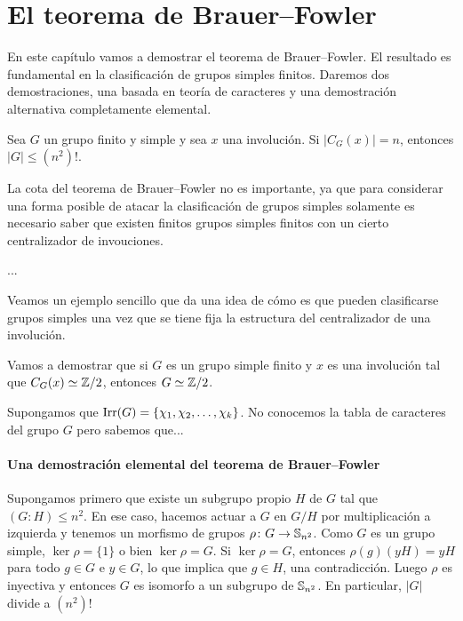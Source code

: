 \chapter{El teorema de Brauer--Fowler}

En este capítulo vamos a demostrar el teorema de Brauer--Fowler. El resultado es fundamental
en la clasificación de grupos simples finitos. Daremos dos demostraciones, una basada en 
teoría de caracteres y una demostración alternativa completamente elemental. 

\begin{theorem}
Sea $G$ un grupo finito y simple y sea $x$ una involución. Si $|C_G(x)|=n$, entonces $|G|\leq (n^2)!$.	
\end{theorem}

La cota del teorema de Brauer--Fowler no es importante, ya que
para considerar una forma posible de atacar la clasificación de grupos simples 
solamente es necesario saber que existen  
finitos grupos simples finitos con un cierto centralizador de invouciones.

\begin{corollary}
...
\end{corollary}

Veamos un ejemplo sencillo que da una idea de cómo es que pueden clasificarse grupos simples
una vez que se tiene fija la estructura del centralizador de una involución. 

Vamos a demostrar
que si $G$ es un grupo simple finito y $x$ es una involución tal que $C_G(x)\simeq\mathbb{Z}/2$, entonces
$G\simeq\mathbb{Z}/2$. 

Supongamos que $\operatorname{Irr}(G)=\{\chi_1,\chi_2,\dots,\chi_k\}$. No conocemos la tabla de caracteres del grupo $G$ 
pero sabemos que...

\subsubsection*{Una demostración elemental del teorema de Brauer--Fowler}

Supongamos primero que existe un subgrupo propio $H$ de $G$ tal que
$(G:H)\leq n^2$. En ese caso, hacemos actuar a $G$ en $G/H$ por multiplicación a izquierda 
y tenemos un morfismo de grupos $\rho\colon G\to\mathbb{S}_{n^2}$. Como $G$ es un grupo simple, 
$\ker\rho=\{1\}$ o bien $\ker\rho=G$. Si $\ker\rho=G$, entonces $\rho(g)(yH)=yH$ para todo
$g\in G$ e $y\in G$, lo que implica que $g\in H$, una contradicción. Luego $\rho$ es inyectiva
y entonces $G$ es isomorfo a un subgrupo de $\mathbb{S}_{n^2}$. En particular, $|G|$ divide a $(n^2)!$

